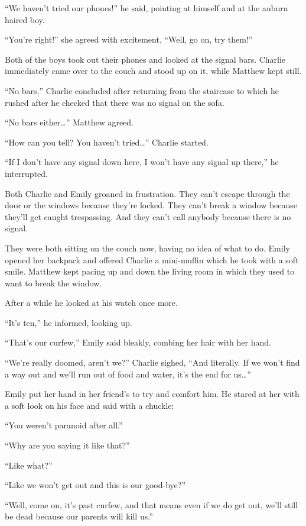 “We haven’t tried our phones!” he said, pointing at himself and at the auburn haired boy.

“You’re right!” she agreed with excitement, “Well, go on, try them!”

Both of the boys took out their phones and looked at the signal bars. Charlie immediately came over to the couch and stood up on it, while Matthew kept still.

“No bars,” Charlie concluded after returning from the staircase to which he rushed after he checked that there was no signal on the sofa.

“No bars either…” Matthew agreed.

“How can you tell? You haven’t tried…” Charlie started.

“If I don’t have any signal down here, I won’t have any signal up there,” he interrupted.

Both Charlie and Emily groaned in frustration. They can’t escape through the door or the windows because they’re locked. They can’t break a window because they’ll get caught trespassing. And they can’t call anybody because there is no signal.

They were both sitting on the couch now, having no idea of what to do. Emily opened her backpack and offered Charlie a mini-muffin which he took with a soft smile. Matthew kept pacing up and down the living room in which they used to want to break the window.

After a while he looked at his watch once more.

“It’s ten,” he informed, looking up.

“That’s our curfew,” Emily said bleakly, combing her hair with her hand.

“We’re really doomed, aren’t we?” Charlie sighed, “And literally. If we won’t find a way out and we’ll run out of food and water, it’s the end for us…”

Emily put her hand in her friend’s to try and comfort him. He stared at her with a soft look on his face and said with a chuckle:

“You weren’t paranoid after all.”

“Why are you saying it like that?”

“Like what?”

“Like we won’t get out and this is our good-bye?”

“Well, come on, it’s past curfew, and that means even if we do get out, we’ll still be dead because our parents will kill us.”

